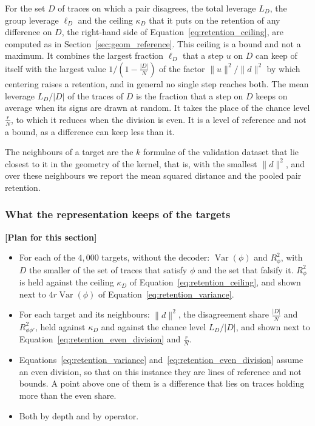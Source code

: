 \documentclass[titlepage,a4paper,11pt]{report}
\DeclareRobustCommand{\RStodo}[1]{\leavevmode{\color{orange!85!black}\textbf{[TODO:}~#1\textbf{]}}}
\newenvironment{RSnewblock}{\par\color{blue!65!black}}{\par}
\newenvironment{RSplan}{\par\medskip\color{orange!85!black}\noindent\textbf{[Plan for this section]}\par}{\par\medskip}
\begin{document}
\begin{RSnewblock}
    For the set $D$ of traces on which a pair disagrees, the total leverage $L_D$, the group leverage $\ell_D$ and the ceiling $\kappa_D$ that it puts on the retention of any difference on $D$, the right-hand side of Equation~\eqref{eq:retention_ceiling}, are computed as in Section~\ref{sec:geom_reference}. This ceiling is a bound and not a maximum. It combines the largest fraction $\ell_D$ that a step $u$ on $D$ can keep of itself with the largest value $1/(1-\frac{|D|}{N})$ of the factor $\lVert u\rVert^2/\lVert d\rVert^2$ by which centering raises a retention, and in general no single step reaches both. The mean leverage $L_D/|D|$ of the traces of $D$ is the fraction that a step on $D$ keeps on average when its signs are drawn at random. It takes the place of the chance level $\frac rN$, to which it reduces when the division is even. It is a level of reference and not a bound, as a difference can keep less than it.

    The neighbours of a target are the $k$ formulae of the validation dataset that lie closest to it in the geometry of the kernel, that is, with the smallest $\lVert d\rVert^2$, and over these neighbours we report the mean squared distance and the pooled pair retention. \RStodo{state $k$}
    \end{RSnewblock}

    \subsubsection{What the representation keeps of the targets}
    \begin{RSplan}
    \begin{itemize}
        \item For each of the $4{,}000$ targets, without the decoder: $\operatorname{Var}(\phi)$ and $R^2_\phi$, with $D$ the smaller of the set of traces that satisfy $\phi$ and the set that falsify it. $R^2_\phi$ is held against the ceiling $\kappa_D$ of Equation~\eqref{eq:retention_ceiling}, and shown next to $4r\operatorname{Var}(\phi)$ of Equation~\eqref{eq:retention_variance}.
        \item For each target and its neighbours: $\lVert d\rVert^2$, the disagreement share $\frac{|D|}{N}$ and $R^2_{\phi\phi'}$, held against $\kappa_D$ and against the chance level $L_D/|D|$, and shown next to Equation~\eqref{eq:retention_even_division} and $\frac rN$.
        \item Equations~\eqref{eq:retention_variance} and~\eqref{eq:retention_even_division} assume an even division, so that on this instance they are lines of reference and not bounds. A point above one of them is a difference that lies on traces holding more than the even share.
        \item Both by depth and by operator.
    \end{itemize}
    \end{RSplan}
\end{document}
